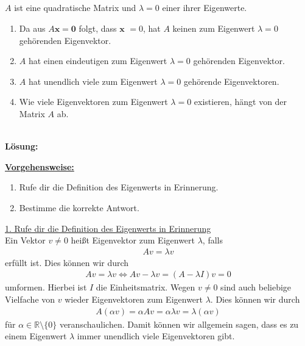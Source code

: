 \newpage
\subsection*{}
$A$ ist eine quadratische Matrix und $\lambda = 0 $ einer ihrer Eigenwerte.

\renewcommand{\labelenumi}{(\alph{enumi})}
\begin{enumerate}
\item 
Da aus $A \textbf{x} = \textbf{0}$ folgt, dass $\textbf{x } = 0$, hat $A$ keinen zum Eigenwert $ \lambda = 0$ gehörenden Eigenvektor.
\item
$A$ hat einen eindeutigen zum Eigenwert $\lambda = 0$ gehörenden Eigenvektor.
\item
$A$ hat unendlich viele zum Eigenwert $\lambda = 0$ gehörende Eigenvektoren.
\item
Wie viele Eigenvektoren zum Eigenwert $\lambda = 0$ existieren, hängt von der Matrix $A$ ab.
\end{enumerate}
\ \\
\textbf{Lösung:}
\begin{mdframed}
\underline{\textbf{Vorgehensweise:}}
\renewcommand{\labelenumi}{\theenumi.}
\begin{enumerate}
\item Rufe dir die Definition des Eigenwerts in Erinnerung.
\item
Bestimme die korrekte Antwort.
\end{enumerate}
\end{mdframed}

\underline{1. Rufe dir die Definition des Eigenwerts in Erinnerung}\\
Ein Vektor $v \neq 0$ heißt Eigenvektor zum Eigenwert $\lambda$, falls
\begin{align*}
Av = \lambda v
\end{align*}
erfüllt ist.
Dies können wir durch
\begin{align*}
Av = \lambda v 
\Leftrightarrow
Av - \lambda v = (A - \lambda I) v = 0
\end{align*}
umformen.
Hierbei ist $I$ die Einheitsmatrix.
Wegen $v \neq 0 $ sind auch beliebige Vielfache von $v$ wieder Eigenvektoren zum Eigenwert $\lambda$.
Dies können wir durch
\begin{align*}
A (\alpha v ) 
= 
\alpha Av 
= \alpha \lambda v
= \lambda (\alpha v) 
\end{align*}
für $\alpha \in \mathbb{R} \setminus \lbrace 0 \rbrace$ veranschaulichen.
Damit können wir allgemein sagen, dass es zu einem Eigenwert $\lambda$ immer unendlich viele Eigenvektoren gibt.\\
\\

